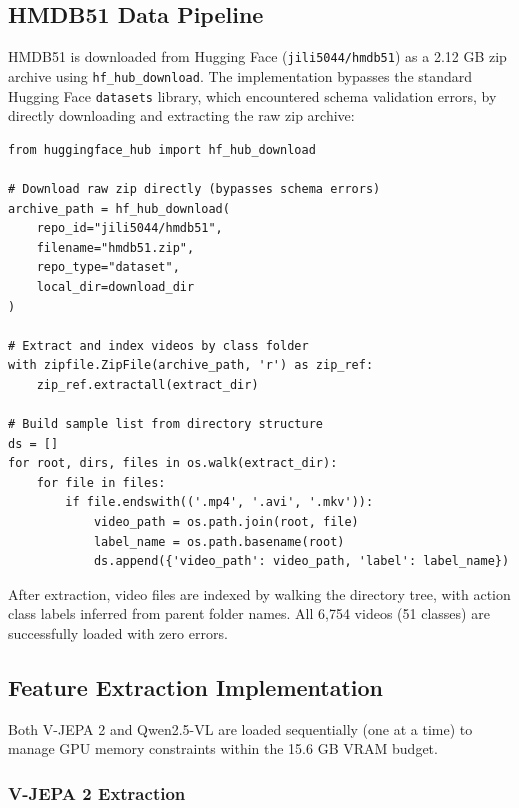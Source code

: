 \subsection{HMDB51 Data Pipeline}

HMDB51 is downloaded from Hugging Face (\texttt{jili5044/hmdb51}) as a 2.12 GB zip archive using \texttt{hf\_hub\_download}. The implementation bypasses the standard Hugging Face \texttt{datasets} library, which encountered schema validation errors, by directly downloading and extracting the raw zip archive:

\begin{lstlisting}[caption={HMDB51 download and local indexing pipeline.}, label={lst:hmdb_download}]
from huggingface_hub import hf_hub_download

# Download raw zip directly (bypasses schema errors)
archive_path = hf_hub_download(
    repo_id="jili5044/hmdb51",
    filename="hmdb51.zip",
    repo_type="dataset",
    local_dir=download_dir
)

# Extract and index videos by class folder
with zipfile.ZipFile(archive_path, 'r') as zip_ref:
    zip_ref.extractall(extract_dir)

# Build sample list from directory structure
ds = []
for root, dirs, files in os.walk(extract_dir):
    for file in files:
        if file.endswith(('.mp4', '.avi', '.mkv')):
            video_path = os.path.join(root, file)
            label_name = os.path.basename(root)
            ds.append({'video_path': video_path, 'label': label_name})
\end{lstlisting}

After extraction, video files are indexed by walking the directory tree, with action class labels inferred from parent folder names. All 6,754 videos (51 classes) are successfully loaded with zero errors.

\subsection{Feature Extraction Implementation}

Both V-JEPA 2 and Qwen2.5-VL are loaded sequentially (one at a time) to manage GPU memory constraints within the 15.6 GB VRAM budget.

\subsubsection{V-JEPA 2 Extraction}


